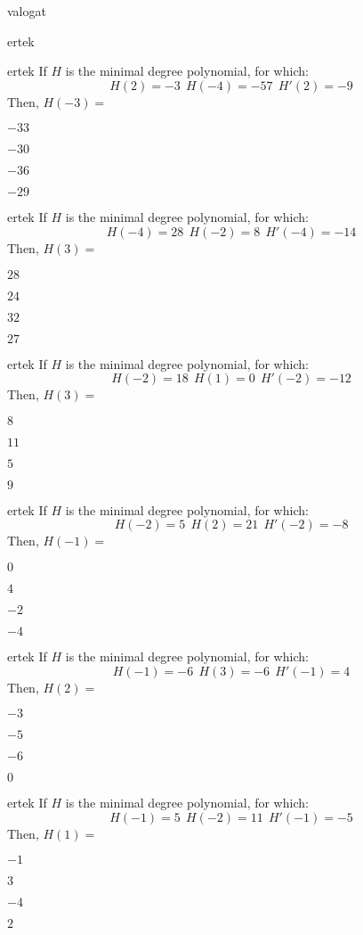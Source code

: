 \documentclass[12pt]{article}
\begin{document}
\begin{quiz}{valogat}
\begin{multi}{ertek}
\end{multi}
\begin{multi}{ertek}
If $H$ is the minimal degree polynomial, for which:
$$
H(2)=-3 \ \  H(-4)=-57 \ \ H'(2)=-9
$$
Then, $H(-3)=$
\item* $ -33 $
\item  $ -30 $
\item  $ -36 $
\item  $ -29 $
\end{multi}
\begin{multi}{ertek}
If $H$ is the minimal degree polynomial, for which:
$$
H(-4)=28 \ \  H(-2)=8 \ \ H'(-4)=-14
$$
Then, $H(3)=$
\item* $ 28 $
\item  $ 24 $
\item  $ 32 $
\item  $ 27 $
\end{multi}
\begin{multi}{ertek}
If $H$ is the minimal degree polynomial, for which:
$$
H(-2)=18 \ \  H(1)=0 \ \ H'(-2)=-12
$$
Then, $H(3)=$
\item* $ 8 $
\item  $ 11 $
\item  $ 5 $
\item  $ 9 $
\end{multi}
\begin{multi}{ertek}
If $H$ is the minimal degree polynomial, for which:
$$
H(-2)=5 \ \  H(2)=21 \ \ H'(-2)=-8
$$
Then, $H(-1)=$
\item* $ 0 $
\item  $ 4 $
\item  $ -2 $
\item  $ -4 $
\end{multi}
\begin{multi}{ertek}
If $H$ is the minimal degree polynomial, for which:
$$
H(-1)=-6 \ \  H(3)=-6 \ \ H'(-1)=4
$$
Then, $H(2)=$
\item* $ -3 $
\item  $ -5 $
\item  $ -6 $
\item  $ 0 $
\end{multi}
\begin{multi}{ertek}
If $H$ is the minimal degree polynomial, for which:
$$
H(-1)=5 \ \  H(-2)=11 \ \ H'(-1)=-5
$$
Then, $H(1)=$
\item* $ -1 $
\item  $ 3 $
\item  $ -4 $
\item  $ 2 $

\end{multi}
\end{quiz}
\end{document}
